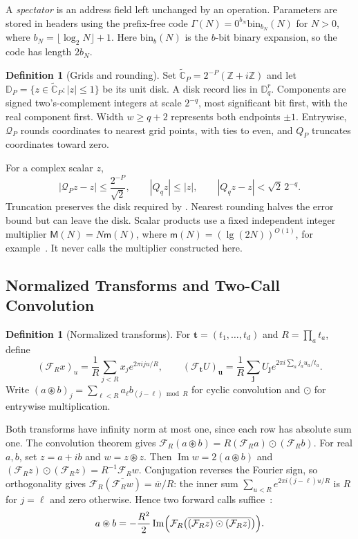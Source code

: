 \documentclass[11pt]{article}
\theoremstyle{definition}
\newtheorem{definition}[theorem]{Definition}
\renewcommand{\label}[1]{}%
\newcommand{\Z}{\mathbb{Z}}
\newcommand{\Cg}{\widetilde{\mathbb{C}}}
\newcommand{\Disk}{\mathbb{D}}
\newcommand{\cF}{\mathcal{F}}
\newcommand{\Quant}{\mathcal{Q}}
\newcommand{\abs}[1]{\left\lvert #1 \right\rvert}
\begin{document}
A \emph{spectator} is an address field left unchanged by an operation.
Parameters are stored in headers using the prefix-free code
$\Gamma(N)=0^{b_N}\mathrm{bin}_{b_N}(N)$ for $N>0$, where
$b_N=\lfloor\log_2N\rfloor+1$.
Here $\mathrm{bin}_b(N)$ is the $b$-bit binary expansion, so the code has
length $2b_N$.

\begin{definition}[Grids and rounding]\label{def:grids}
Set $\Cg_P=2^{-P}(\Z+i\Z)$ and let
$\Disk_P=\{z\in\Cg_P:\abs{z}\le1\}$ be its unit disk.
A disk record lies in $\Disk_q^r$.
Components are signed two's-complement integers at scale $2^{-q}$,
most significant bit first, with the real component first.
Width $w\ge q+2$ represents both endpoints $\pm1$.
Entrywise, $\Quant_P$ rounds coordinates to nearest grid points, with ties
to even, and $Q_P$ truncates coordinates toward zero.
\end{definition}
For a complex scalar $z$,
\begin{equation}\label{eq:trunc-round}
 \abs{\Quant_Pz-z}\le\frac{2^{-P}}{\sqrt2},\qquad
 \abs{Q_qz}\le\abs{z},\qquad
 \abs{Q_qz-z}<\sqrt2\,2^{-q}.
\end{equation}
Truncation preserves the disk required by .
Nearest rounding halves the error bound but can leave the disk.
Scalar products use a fixed independent integer multiplier
$\mathsf M(N)=N\mathsf m(N)$, where $\mathsf m(N)=(\lg(2N))^{O(1)}$,
for example~\cite{SS71}. It never calls the multiplier constructed here.

\subsection{Normalized Transforms and Two-Call Convolution}
\label{sec:prelim-dft}

\begin{definition}[Normalized transforms]\label{def:transforms}
For $\mathbf t=(t_1,\ldots,t_d)$ and $R=\prod_at_a$, define
\[
 (\cF_Rx)_u=\frac1R\sum_{j<R}x_je^{2\pi iju/R},
 \qquad
 (\cF_{\mathbf t}U)_{\mathbf u}
 =\frac1R\sum_{\mathbf j}U_{\mathbf j}
       e^{2\pi i\sum_a j_au_a/t_a}.
\]
Write $(a\circledast b)_j=\sum_{\ell<R}a_\ell b_{(j-\ell)\bmod R}$
for cyclic convolution and $\odot$ for entrywise multiplication.
\end{definition}
Both transforms have infinity norm at most one, since each row has absolute
sum one. The convolution theorem gives
$\cF_R(a\circledast b)=R(\cF_Ra)\odot(\cF_Rb)$.
For real $a,b$, set $z=a+ib$ and $w=z\circledast z$.
Then $\operatorname{Im}w=2(a\circledast b)$ and
$(\cF_Rz)\odot(\cF_Rz)=R^{-1}\cF_Rw$.
Conjugation reverses the Fourier sign, so orthogonality gives
$\cF_R(\overline{\cF_Rw})=\overline w/R$:
the inner sum $\sum_{u<R}e^{2\pi i(j-\ell)u/R}$ is $R$ for $j=\ell$
and zero otherwise. Hence two forward calls suffice~\cite{MS}:
\begin{equation}\label{eq:two-call}
 a\circledast b
 =-\frac{R^2}{2}\operatorname{Im}
   \Bigl(\cF_R\bigl(\overline{(\cF_Rz)\odot(\cF_Rz)}\bigr)\Bigr).
\end{equation}
\end{document}

